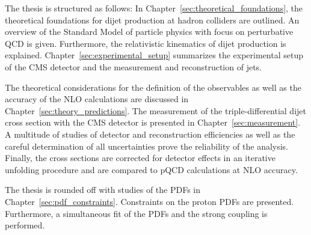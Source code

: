 The thesis is structured as follows: In
Chapter~\ref{sec:theoretical_foundations}, the theoretical foundations for dijet
production at hadron colliders are outlined. An overview of the Standard Model
of particle physics with focus on perturbative QCD is given.  Furthermore, the
relativistic kinematics of dijet production is explained.
Chapter~\ref{sec:experimental_setup} summarizes the experimental setup of the
CMS detector and the measurement and reconstruction of jets. 

The theoretical considerations for the definition of the observables as well as
the accuracy of the NLO calculations are discussed in
Chapter~\ref{sec:theory_predictions}. The measurement of the triple-differential
dijet cross section with the CMS detector is presented in
Chapter~\ref{sec:measurement}. A multitude of studies of detector and
reconstruction efficiencies as well as the careful determination of all
uncertainties prove the reliability of the analysis.  Finally, the cross
sections are corrected for detector effects in an iterative unfolding procedure
and are compared to pQCD calculations at NLO accuracy.

The thesis is rounded off with studies of the PDFs in
Chapter~\ref{sec:pdf_constraints}. Constraints on the proton PDFs are presented.
Furthermore, a simultaneous fit of the PDFs and the strong coupling is
performed.

